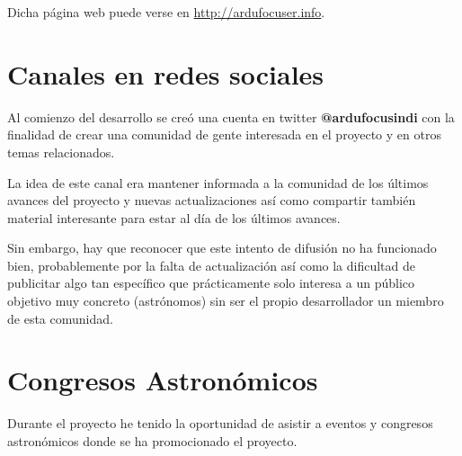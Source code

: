 Dicha página web puede verse en \url{http://ardufocuser.info}.

\section{Canales en redes sociales}

Al comienzo del desarrollo se creó una cuenta en twitter \textbf{@ardufocusindi} con la finalidad de crear una comunidad de gente interesada en el proyecto y en otros temas relacionados.

La idea de este canal era mantener informada a la comunidad de los últimos avances del proyecto y nuevas actualizaciones así como compartir también material interesante para estar al día de los últimos avances.

Sin embargo, hay que reconocer que este intento de difusión no ha funcionado bien, probablemente por la falta de actualización así como la dificultad de publicitar algo tan específico que prácticamente solo interesa a un público objetivo muy concreto (astrónomos) sin ser el propio desarrollador un miembro de esta comunidad.


\section{Congresos Astronómicos}

Durante el proyecto he tenido la oportunidad de asistir a eventos y congresos astronómicos donde se ha promocionado el proyecto. 


